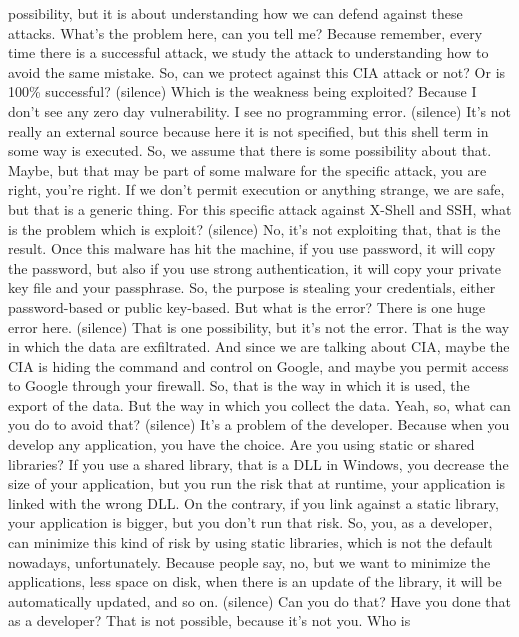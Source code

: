  possibility, but it is about understanding how we can defend against these
 attacks. What's the problem here, can you tell me? Because remember, every
 time there is a successful attack, we study the attack to understanding how to
 avoid the same mistake. So, can we protect against this CIA attack or not? Or
 is 100\% successful? (silence) Which is the weakness being exploited? Because I
 don't see any zero day vulnerability. I see no programming error. (silence)
 It's not really an external source because here it is not specified, but this
 shell term in some way is executed. So, we assume that there is some
 possibility about that. Maybe, but that may be part of some malware for the
 specific attack, you are right, you're right. If we don't permit execution or
 anything strange, we are safe, but that is a generic thing. For this specific
 attack against X-Shell and SSH, what is the problem which is exploit?
 (silence) No, it's not exploiting that, that is the result. Once this malware
 has hit the machine, if you use password, it will copy the password, but also
 if you use strong authentication, it will copy your private key file and your
 passphrase. So, the purpose is stealing your credentials, either
 password-based or public key-based. But what is the error? There is one huge
 error here. (silence) That is one possibility, but it's not the error. That is
 the way in which the data are exfiltrated. And since we are talking about CIA,
 maybe the CIA is hiding the command and control on Google, and maybe you
 permit access to Google through your firewall. So, that is the way in which it
 is used, the export of the data. But the way in which you collect the data.
 Yeah, so, what can you do to avoid that? (silence) It's a problem of the
 developer. Because when you develop any application, you have the choice. Are
 you using static or shared libraries? If you use a shared library, that is a
 DLL in Windows, you decrease the size of your application, but you run the
 risk that at runtime, your application is linked with the wrong DLL. On the
 contrary, if you link against a static library, your application is bigger,
 but you don't run that risk. So, you, as a developer, can minimize this kind
 of risk by using static libraries, which is not the default nowadays,
 unfortunately. Because people say, no, but we want to minimize the
 applications, less space on disk, when there is an update of the library, it
 will be automatically updated, and so on. (silence) Can you do that? Have you
 done that as a developer? That is not possible, because it's not you. Who is
